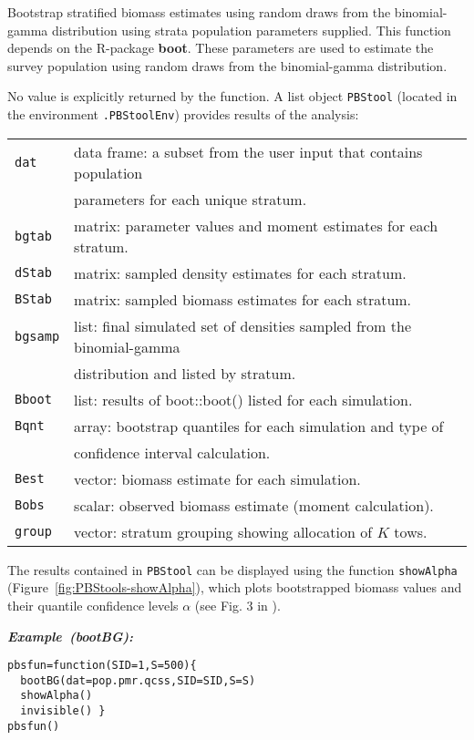 \documentclass[letterpaper,12pt,fleqn]{article}
\def\tab{\hspace{0.5 in}}
\newcommand{\code}[1]{\small\texttt{#1}\normalsize}
\newcommand{\pkg}[1]{{\bf #1}}
\newcommand\example[1]{    %
	\textbf{\emph{Example~(#1):}}\\ \vspace{3 pt}
}
\begin{document}
\tab Bootstrap stratified biomass estimates using random draws from the binomial-gamma distribution using strata population parameters \citep{Schnute-Haigh:2003} supplied. This function depends on the R-package \pkg{boot}. These parameters are used to estimate the survey population using random draws from the binomial-gamma distribution.

\tab No value is explicitly returned by the function. A list object \code{PBStool} (located in the environment \code{.PBStoolEnv}) provides results of the analysis:

\begin{tabular}{ll}
	\code{dat}    & data frame: a subset from the user input that contains population \\
	              & parameters for each unique stratum.\\
	\code{bgtab}  & matrix: parameter values and moment estimates for each stratum.\\
	\code{dStab}  & matrix: sampled density estimates for each stratum.\\
	\code{BStab}  & matrix: sampled biomass estimates for each stratum.\\
	\code{bgsamp} & list: final simulated set of densities sampled from the binomial-gamma \\
	              & distribution and listed by stratum.\\
	\code{Bboot}  & list: results of boot::boot() listed for each simulation.\\
	\code{Bqnt}   & array: bootstrap quantiles for each simulation and type of \\
	              & confidence interval calculation.\\
	\code{Best}   & vector: biomass estimate for each simulation.\\
	\code{Bobs}   & scalar: observed biomass estimate (moment calculation).\\
	\code{group}  & vector: stratum grouping showing allocation of $K$ tows.\\
\end{tabular}

\tab The results contained in \code{PBStool} can be displayed using the function \code{showAlpha} (Figure~\ref{fig:PBStools-showAlpha}), which plots bootstrapped biomass values and their quantile confidence levels $\alpha$ (see Fig. 3 in \citet{Schnute-Haigh:2003}).

\begin{examplebox}
\example{bootBG}
\begin{Verbatim}[fontsize=\footnotesize]
pbsfun=function(SID=1,S=500){
  bootBG(dat=pop.pmr.qcss,SID=SID,S=S)
  showAlpha()
  invisible() }
pbsfun()
\end{Verbatim}
\end{examplebox}
\end{document}
